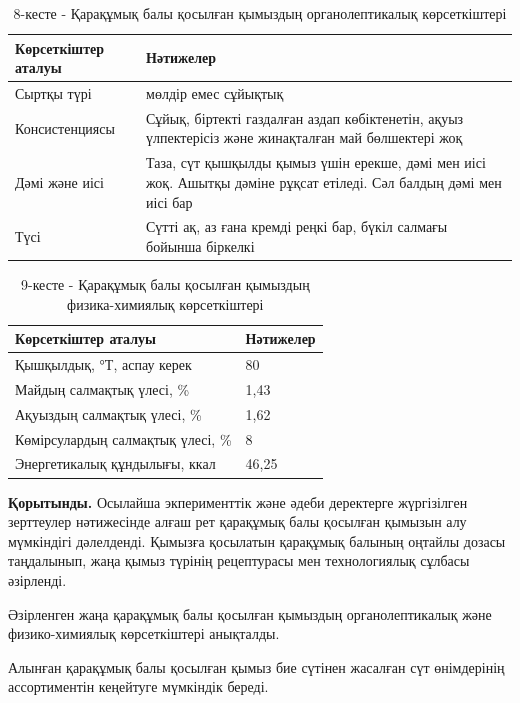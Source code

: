 \begin{table}[H]
\caption*{8-кесте - Қарақұмық балы қосылған қымыздың органолептикалық көрсеткіштері}
\centering
\begin{tabular}{|l|p{}|}
\hline
Көрсеткіштер аталуы & Нәтижелер \\ \hline
Сыртқы түрі & мөлдір емес сұйықтық \\ \hline
Консистенциясы & Сұйық, біртекті газдалған аздап көбіктенетін, ақуыз үлпектерісіз және жинақталған май бөлшектері жоқ \\ \hline
Дәмі және иісі & Таза, сүт қышқылды қымыз үшін ерекше, дәмі мен иісі жоқ. Ашытқы дәміне рұқсат етіледі. Сәл балдың дәмі мен иісі бар \\ \hline
Түсі & Сүтті ақ, аз ғана кремді реңкі бар, бүкіл салмағы бойынша біркелкі \\ \hline
\end{tabular}
\end{table}

\begin{table}[H]
\caption*{9-кесте - Қарақұмық балы қосылған қымыздың физика-химиялық көрсеткіштері}
\centering
\begin{tabular}{|l|l|}
\hline
Көрсеткіштер аталуы & Нәтижелер \\ \hline
Қышқылдық, °Т, аспау керек & 80 \\ \hline
Майдың салмақтық үлесі, \% & 1,43 \\ \hline
Ақуыздың салмақтық үлесі, \% & 1,62 \\ \hline
Көмірсулардың салмақтық үлесі, \% & 8 \\ \hline
Энергетикалық құндылығы, ккал & 46,25 \\ \hline
\end{tabular}
\end{table}

\begin{multicols}{2}
{\bfseries Қорытынды.} Осылайша экперименттік және әдеби деректерге
жүргізілген зерттеулер нәтижесінде алғаш рет қарақұмық балы қосылған
қымызын алу мүмкіндігі дәлелденді. Қымызға қосылатын қарақұмық балының
оңтайлы дозасы таңдалынып, жаңа қымыз түрінің рецептурасы мен
технологиялық сұлбасы әзірленді.

Әзірленген жаңа қарақұмық балы қосылған қымыздың органолептикалық және
физико-химиялық көрсеткіштері анықталды.

Алынған қарақұмық балы қосылған қымыз бие сүтінен жасалған сүт
өнімдерінің ассортиментін кеңейтуге мүмкіндік береді.
\end{multicols}

